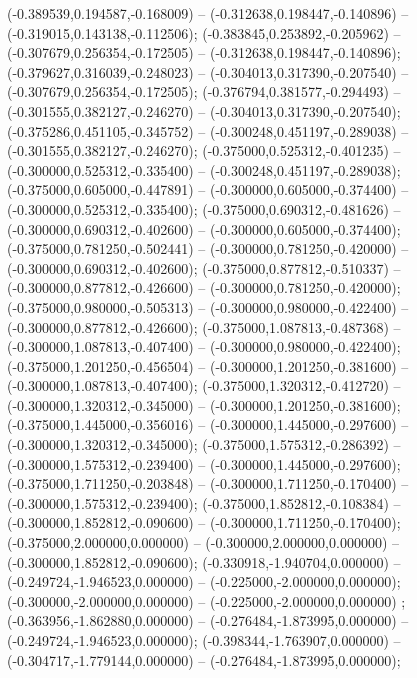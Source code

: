  (-0.389539,0.194587,-0.168009) -- (-0.312638,0.198447,-0.140896) -- (-0.319015,0.143138,-0.112506);
 (-0.383845,0.253892,-0.205962) -- (-0.307679,0.256354,-0.172505) -- (-0.312638,0.198447,-0.140896);
 (-0.379627,0.316039,-0.248023) -- (-0.304013,0.317390,-0.207540) -- (-0.307679,0.256354,-0.172505);
 (-0.376794,0.381577,-0.294493) -- (-0.301555,0.382127,-0.246270) -- (-0.304013,0.317390,-0.207540);
 (-0.375286,0.451105,-0.345752) -- (-0.300248,0.451197,-0.289038) -- (-0.301555,0.382127,-0.246270);
 (-0.375000,0.525312,-0.401235) -- (-0.300000,0.525312,-0.335400) -- (-0.300248,0.451197,-0.289038);
 (-0.375000,0.605000,-0.447891) -- (-0.300000,0.605000,-0.374400) -- (-0.300000,0.525312,-0.335400);
 (-0.375000,0.690312,-0.481626) -- (-0.300000,0.690312,-0.402600) -- (-0.300000,0.605000,-0.374400);
 (-0.375000,0.781250,-0.502441) -- (-0.300000,0.781250,-0.420000) -- (-0.300000,0.690312,-0.402600);
 (-0.375000,0.877812,-0.510337) -- (-0.300000,0.877812,-0.426600) -- (-0.300000,0.781250,-0.420000);
 (-0.375000,0.980000,-0.505313) -- (-0.300000,0.980000,-0.422400) -- (-0.300000,0.877812,-0.426600);
 (-0.375000,1.087813,-0.487368) -- (-0.300000,1.087813,-0.407400) -- (-0.300000,0.980000,-0.422400);
 (-0.375000,1.201250,-0.456504) -- (-0.300000,1.201250,-0.381600) -- (-0.300000,1.087813,-0.407400);
 (-0.375000,1.320312,-0.412720) -- (-0.300000,1.320312,-0.345000) -- (-0.300000,1.201250,-0.381600);
 (-0.375000,1.445000,-0.356016) -- (-0.300000,1.445000,-0.297600) -- (-0.300000,1.320312,-0.345000);
 (-0.375000,1.575312,-0.286392) -- (-0.300000,1.575312,-0.239400) -- (-0.300000,1.445000,-0.297600);
 (-0.375000,1.711250,-0.203848) -- (-0.300000,1.711250,-0.170400) -- (-0.300000,1.575312,-0.239400);
 (-0.375000,1.852812,-0.108384) -- (-0.300000,1.852812,-0.090600) -- (-0.300000,1.711250,-0.170400);
 (-0.375000,2.000000,0.000000) -- (-0.300000,2.000000,0.000000) -- (-0.300000,1.852812,-0.090600);
 (-0.330918,-1.940704,0.000000) -- (-0.249724,-1.946523,0.000000) -- (-0.225000,-2.000000,0.000000);
 (-0.300000,-2.000000,0.000000) -- (-0.225000,-2.000000,0.000000) ;
 (-0.363956,-1.862880,0.000000) -- (-0.276484,-1.873995,0.000000) -- (-0.249724,-1.946523,0.000000);
 (-0.398344,-1.763907,0.000000) -- (-0.304717,-1.779144,0.000000) -- (-0.276484,-1.873995,0.000000);
